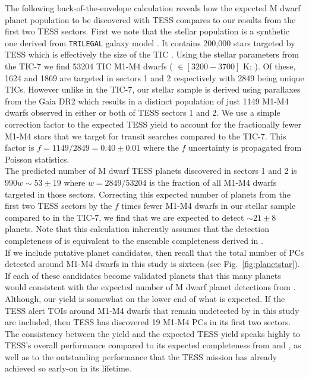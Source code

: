 The following back-of-the-envelope calculation reveals how the expected
M dwarf planet population to be discovered with TESS compares to our \pipeline{} results
from the first two TESS sectors. First we note
that the \cite{sullivan15} stellar population is a synthetic one derived from \texttt{TRILEGAL}
galaxy model \citep{girardi05}. It contains 200,000 stars targeted by TESS which is
effectively the size of the TIC \citep{stassun17}. Using the stellar parameters from the TIC-7
we find 53204 TIC M1-M4 dwarfs (\teff{} $\in [3200-3700]$ K; \citealt{pecaut13}).
Of these, 1624 and 1869 are targeted in sectors 1 and 2 respectively with 2849
being unique TICs. However unlike in the TIC-7,
our stellar sample is derived using parallaxes from the Gaia DR2 which results in
a distinct population of just 1149 M1-M4 dwarfs observed in either or both of TESS sectors 1
and 2. We use a simple correction factor to the expected TESS yield to account for the
fractionally fewer M1-M4 stars that we target for transit searches compared to the TIC-7.
This factor is $f=1149/2849 = 0.40 \pm 0.01$ where the $f$ uncertainty
is propagated from Poisson statistics.  \\

The predicted number of M dwarf TESS planets discovered in sectors 1 and 2 is
$990w \sim 53 \pm 19$ where $w=2849/53204$ is the fraction of all M1-M4 dwarfs targeted in
those sectors. Correcting this expected number of planets from the first two TESS sectors
by the $f$ times fewer M1-M4 dwarfs in our stellar sample compared to in the TIC-7,
we find that we are expected to detect
$\sim 21 \pm 8$ planets. Note that this calculation inherently assumes that the detection
completeness of \pipeline{} is equivalent to the ensemble completeness derived in \cite{ballard18}.  \\

If we include putative planet candidates, then recall that the
total number of PCs detected around M1-M4 dwarfs in this study is sixteen (see
Fig.~\ref{fig:planetstar}). If each of these candidates become validated planets that this
many planets would consistent with the expected number of M dwarf planet detections from
\cite{ballard18}. Although, our yield is somewhat on the lower end of what is expected.
If the TESS alert TOIs around M1-M4 dwarfs that remain undetected by \pipeline{} in this study are
included, then TESS has discovered 19 M1-M4 PCs in its first two sectors.
The consistency between the \pipeline{} yield and the expected TESS yield speaks highly to TESS's
overall performance compared to its expected completeness from \cite{sullivan15} and
\cite{ballard18}, as well as to the outstanding performance that the TESS mission has
already achieved so early-on in its lifetime.

